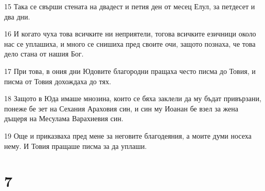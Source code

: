 \par 15 Така се свърши стената на двадест и петия ден от месец Елул, за петдесет и два дни.
\par 16 И когато чуха това всичките ни неприятели, тогова всичките езичници около нас се уплашиха, и много се снишиха пред своите очи, защото познаха, че това дело стана от нашия Бог.
\par 17 При това, в ония дни Юдовите благородни пращаха често писма до Товия, и писма от Товия дохождаха до тях.
\par 18 Защото в Юда имаше мнозина, които се бяха заклели да му бъдат привързани, понеже бе зет на Сехания Араховия син, и син му Иоанан бе взел за жена дъщеря на Месулама Варахиевия син.
\par 19 Още и приказваха пред мене за неговите благодеяния, а моите думи носеха нему. И Товия пращаше писма за да уплаши.

\chapter{7}

